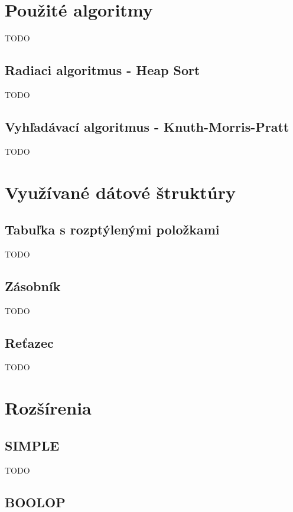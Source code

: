 \documentclass[11pt,a4paper]{article}
\begin{document}
\section{Použité algoritmy} 
\label{algoritmy}

TODO

    \subsection{Radiaci algoritmus - Heap Sort}
    
    TODO

    \subsection{Vyhľadávací algoritmus - Knuth-Morris-Pratt}
    
    TODO
    
\section{Využívané dátové štruktúry} 
\label{struktury}

        \subsection{Tabuľka s rozptýlenými položkami}
    
    TODO
    
        \subsection{Zásobník}
    
    TODO
    
        \subsection{Reťazec}
    
    TODO
    
\section{Rozšírenia} 
\label{rozsirenia}

    \subsection{SIMPLE}
    
    TODO
    
    \subsection{BOOLOP}
    
\end{document}
